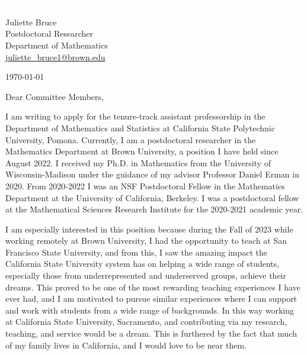 \documentclass[11pt]{article}
\begin{document}
\section*{}

\noindent
\begin{minipage}{0.99\textwidth}
\begin{minipage}{0.69\textwidth}
\textcolor{white}{.}
\end{minipage}
\begin{minipage}{0.29\textwidth}
{
Juliette Bruce \\
Postdoctoral Researcher \\
Department of Mathematics \\
\href{mailto:juliette\_bruce1@brown.edu}{juliette\_bruce1@brown.edu}
}

\vspace{12pt}
\today
\end{minipage}
\end{minipage}


\vspace{12pt}
\noindent
Dear Committee Members,

I am writing to apply for the tenure-track assistant professorship in the Department of Mathematics and Statistics at California State Polytechnic University, Pomona. Currently, I am a postdoctoral researcher in the Mathematics Department at Brown University, a position I have held since August 2022. I received my Ph.D. in Mathematics from the University of Wisconsin-Madison under the guidance of my advisor Professor Daniel Erman in 2020. From 2020-2022 I was an NSF Postdoctoral Fellow in the Mathematics Department at the University of California, Berkeley. I was a postdoctoral fellow at the Mathematical Sciences Research Institute for the 2020-2021 academic year.

I am especially interested in this position because during the Fall of 2023 while working remotely at Brown University, I had the opportunity to teach at San Francisco State University, and from this, I saw the amazing impact the California State University system has on helping a wide range of students, especially those from underrepresented and underserved groups, achieve their dreams. This proved to be one of the most rewarding teaching experiences I have ever had, and I am motivated to pursue similar experiences where I can support and work with students from a wide range of backgrounds.  In this way working at California State University, Sacramento, and contributing via my research, teaching, and service would be a dream. This is furthered by the fact that much of my family lives in California, and I would love to be near them. 
\end{document}
